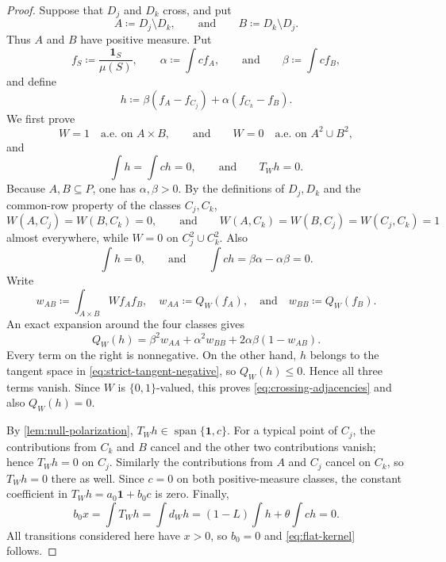 \documentclass[10pt]{article}
\numberwithin{equation}{section}
\newcommand{\one}{\mathbf 1}
\begin{document}
\begin{proof}
Suppose that $D_j$ and $D_k$ cross, and put
\[
 A\coloneqq D_j\setminus D_k,
 \qquad\text{and}\qquad
 B\coloneqq D_k\setminus D_j.
\]
Thus $A$ and $B$ have positive measure.  Put
\[
 f_S\coloneqq\frac{\one_S}{\mu(S)},
 \qquad
 \alpha\coloneqq\int c f_A,
 \qquad\text{and}\qquad
 \beta\coloneqq\int c f_B,
\]
and define
\begin{equation}\label{eq:weighted-flat-move}
 h\coloneqq\beta(f_A-f_{C_j})+\alpha(f_{C_k}-f_B).
\end{equation}
We first prove
\begin{equation}\label{eq:crossing-adjacencies}
 W=1\quad\text{a.e. on }A\times B,
 \qquad\text{and}\qquad
 W=0\quad\text{a.e. on }A^2\cup B^2,
\end{equation}
and
\begin{equation}\label{eq:flat-kernel}
 \int h=\int ch=0,
 \qquad\text{and}\qquad
 T_Wh=0.
\end{equation}
Because $A,B\subseteq P$, one has $\alpha,\beta>0$.  By the definitions of $D_j,D_k$ and the common-row property of the classes $C_j,C_k$,
\[
 W(A,C_j)=W(B,C_k)=0,
 \qquad\text{and}\qquad
 W(A,C_k)=W(B,C_j)=W(C_j,C_k)=1
\]
almost everywhere, while $W=0$ on $C_j^2\cup C_k^2$.  Also
\[
 \int h=0,
 \qquad\text{and}\qquad
 \int ch=\beta\alpha-\alpha\beta=0.
\]
Write
\[
 w_{AB}\coloneqq\int_{A\times B}W f_Af_B,
 \quad
 w_{AA}\coloneqq Q_W(f_A),
 \quad\text{and}\quad
 w_{BB}\coloneqq Q_W(f_B).
\]
An exact expansion around the four classes gives
\begin{equation}\label{eq:crossing-Q-expansion}
 Q_W(h)
 =\beta^2w_{AA}+\alpha^2w_{BB}
   +2\alpha\beta(1-w_{AB}).
\end{equation}
Every term on the right is nonnegative.  On the other hand, $h$ belongs to the tangent space in \cref{eq:strict-tangent-negative}, so $Q_W(h)\le0$.  Hence all three terms vanish.  Since $W$ is $\{0,1\}$-valued, this proves \cref{eq:crossing-adjacencies} and also $Q_W(h)=0$.

By \cref{lem:null-polarization}, $T_Wh\in\operatorname{span}\{\one,c\}$.  For a typical point of $C_j$, the contributions from $C_k$ and $B$ cancel and the other two contributions vanish; hence $T_Wh=0$ on $C_j$.  Similarly the contributions from $A$ and $C_j$ cancel on $C_k$, so $T_Wh=0$ there as well.  Since $c=0$ on both positive-measure classes, the constant coefficient in $T_Wh=a_0\one+b_0c$ is zero.  Finally,
\[
 b_0x=\int T_Wh=\int d_Wh
 =(1-L)\int h+\theta\int ch=0.
\]
All transitions considered here have $x>0$, so $b_0=0$ and \cref{eq:flat-kernel} follows.


\end{proof}
\end{document}
